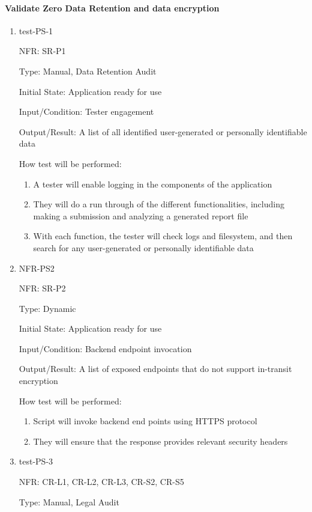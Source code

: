 \documentclass[12pt, titlepage]{article}
\begin{document}
\paragraph{Validate Zero Data Retention and data encryption}
\begin{enumerate}
  \item{test-PS-1}
  
  NFR: SR-P1

  Type: Manual, Data Retention Audit

  Initial State: Application ready for use

  Input/Condition: Tester engagement

  Output/Result: A list of all identified user-generated or personally identifiable data

  How test will be performed:
  \begin{enumerate}
    \item A tester will enable logging in the components of the application
    \item They will do a run through of the different functionalities, including making a submission and analyzing a generated report file
    \item With each function, the tester will check logs and filesystem, and then
    search for any user-generated or personally identifiable data
  \end{enumerate}


  \item{NFR-PS2}
  
  NFR: SR-P2 

  Type: Dynamic

  Initial State: Application ready for use

  Input/Condition: Backend endpoint invocation

  Output/Result: A list of exposed endpoints that do not support in-transit encryption

  How test will be performed:
  \begin{enumerate}
    \item Script will invoke backend end points using HTTPS protocol
    \item They will ensure that the response provides relevant security headers
  \end{enumerate}


  \item{test-PS-3}
  
  NFR: CR-L1, CR-L2, CR-L3, CR-S2, CR-S5

  Type: Manual, Legal Audit


\end{enumerate}
\end{document}
